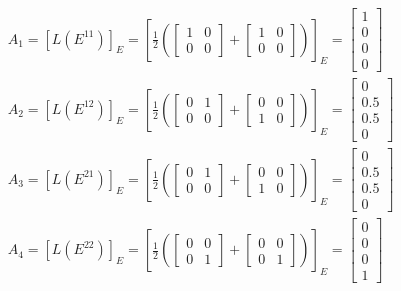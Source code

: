 \documentclass[a4paper]{article}
\begin{document}
\begin{qalist}
		\begin{align}
			{A}_{1} = {[L({E}^{11})]}_{E} ={\left[ \frac{1}{2} (\begin{bmatrix}1 & 0 \\ 0 & 0\end{bmatrix} + \begin{bmatrix}1 & 0 \\ 0 & 0\end{bmatrix})\right]}_{E} = \begin{bmatrix}1 \\ 0 \\ 0 \\ 0\end{bmatrix} \\
			{A}_{2} = {[L({E}^{12})]}_{E} ={\left[ \frac{1}{2} (\begin{bmatrix}0 & 1 \\ 0 & 0\end{bmatrix} + \begin{bmatrix}0 & 0 \\ 1 & 0\end{bmatrix})\right]}_{E} = \begin{bmatrix}0 \\ 0.5 \\ 0.5 \\ 0\end{bmatrix} \\
			{A}_{3} = {[L({E}^{21})]}_{E} ={\left[ \frac{1}{2} (\begin{bmatrix}0 & 1 \\ 0 & 0\end{bmatrix} + \begin{bmatrix}0 & 0 \\ 1 & 0\end{bmatrix})\right]}_{E} = \begin{bmatrix}0 \\ 0.5 \\ 0.5 \\ 0\end{bmatrix} \\
			{A}_{4} = {[L({E}^{22})]}_{E} ={\left[ \frac{1}{2} (\begin{bmatrix}0 & 0 \\ 0 & 1\end{bmatrix} + \begin{bmatrix}0 & 0 \\ 0 & 1\end{bmatrix})\right]}_{E} = \begin{bmatrix}0 \\ 0 \\ 0 \\ 1\end{bmatrix} \\
		\end{align}
		

\end{qalist}
\end{document}
